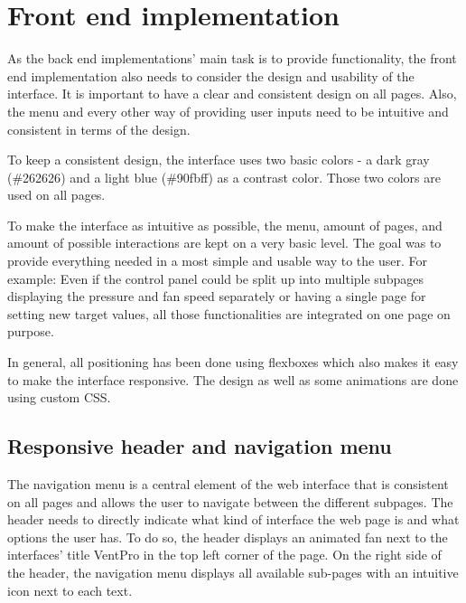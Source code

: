 \chapter{Front end implementation}
\label{ch:front_end_implementation}

As the back end implementations' main task is to provide functionality, the front end implementation also needs to consider the design and usability of the interface. It is important to have a clear and consistent design on all pages. Also, the menu and every other way of providing user inputs need to be intuitive and consistent in terms of the design. 

To keep a consistent design, the interface uses two basic colors - a dark gray (\textcolor{ventpro_gray}{\#262626}) and a light blue (\textcolor{ventpro_blue}{\#90fbff}) as a contrast color. Those two colors are used on all pages.

To make the interface as intuitive as possible, the menu, amount of pages, and amount of possible interactions are kept on a very basic level. The goal was to provide everything needed in a most simple and usable way to the user. For example: Even if the control panel could be split up into multiple subpages displaying the pressure and fan speed separately or having a single page for setting new target values, all those functionalities are integrated on one page on purpose.

In general, all positioning has been done using flexboxes which also makes it easy to make the interface responsive. The design as well as some animations are done using custom CSS.





\section{Responsive header and navigation menu}
\label{sec:responsive_header_and_navigation_menu}

The navigation menu is a central element of the web interface that is consistent on all pages and allows the user to navigate between the different subpages. The header needs to directly indicate what kind of interface the web page is and what options the user has. To do so, the header displays an animated fan next to the interfaces’ title VentPro in the top left corner of the page. On the right side of the header, the navigation menu displays all available sub-pages with an intuitive icon next to each text.

